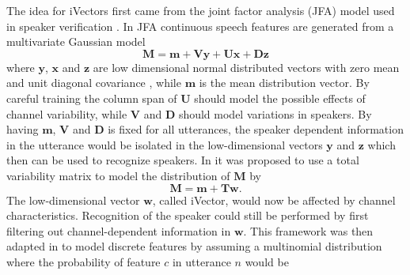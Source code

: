 The idea for iVectors first came from the joint factor analysis (JFA) model used in speaker verification \cite{dehak2011front}. In JFA continuous speech features are generated from a multivariate Gaussian model
\begin{equation}
\label{jfa}
\mathbf{M}=\mathbf{m}+\mathbf{Vy}+\mathbf{Ux}+\mathbf{Dz}
\end{equation}
where $\mathbf{y}$, $\mathbf{x}$ and $\mathbf{z}$ are low dimensional normal distributed vectors with zero mean and unit diagonal covariance \cite{dehak2011front}, while $\mathbf{m}$ is the mean distribution vector. By careful training the column span of $\mathbf{U}$ should model the possible effects of channel variability, while $\mathbf{V}$ and $\mathbf{D}$ should model variations in speakers. By having $\mathbf{m}$, $\mathbf{V}$ and $\mathbf{D}$ is fixed for all utterances, the speaker dependent information in the utterance would be isolated in the low-dimensional vectors $\mathbf{y}$ and $\mathbf{z}$ which then can be used to recognize speakers. In \cite{dehak2011front} it was proposed to use a total variability matrix to model the distribution of $\mathbf{M}$ by
\begin{equation}
\label{ffa}
\mathbf{M}=\mathbf{m}+\mathbf{Tw}.
\end{equation}
The low-dimensional vector $\mathbf{w}$, called iVector, would now be affected by channel characteristics. Recognition of the speaker could still be performed by first filtering out channel-dependent information in $\mathbf{w}$. This framework was then adapted in \cite{srivector} to model discrete features by assuming a multinomial distribution where the probability of feature $c$ in utterance $n$ would be 
